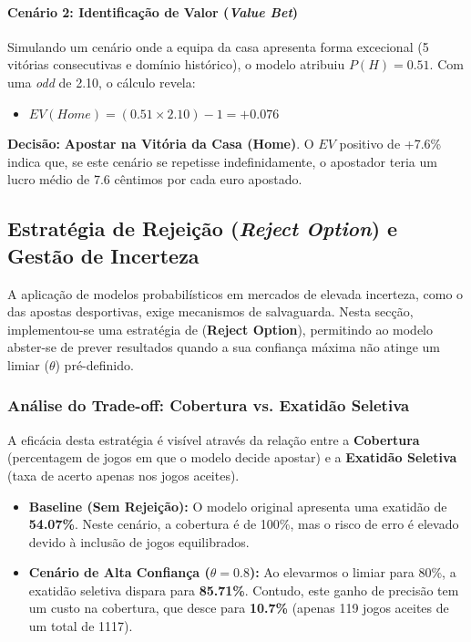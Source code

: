 \documentclass[10pt]{article}
\begin{document}
\paragraph{Cenário 2: Identificação de Valor (\textit{Value Bet})} 
Simulando um cenário onde a equipa da casa apresenta forma excecional (5 vitórias consecutivas e domínio histórico), o modelo atribuiu $P(H) = 0.51$. Com uma \textit{odd} de 2.10, o cálculo revela:
\begin{itemize}
    \item $EV(Home) = (0.51 \times 2.10) - 1 = +0.076$
\end{itemize}
\textbf{Decisão:} \textbf{Apostar na Vitória da Casa (Home)}. O $EV$ positivo de +7.6\% indica que, se este cenário se repetisse indefinidamente, o apostador teria um lucro médio de 7.6 cêntimos por cada euro apostado.

\subsection{Estratégia de Rejeição (\textit{Reject Option}) e Gestão de Incerteza}

A aplicação de modelos probabilísticos em mercados de elevada incerteza, como o das apostas desportivas, exige mecanismos de salvaguarda. Nesta secção, implementou-se uma estratégia de (\textbf{Reject Option}), permitindo ao modelo abster-se de prever resultados quando a sua confiança máxima não atinge um limiar ($\theta$) pré-definido.

\subsubsection{Análise do Trade-off: Cobertura vs. Exatidão Seletiva}

A eficácia desta estratégia é visível através da relação entre a \textbf{Cobertura} (percentagem de jogos em que o modelo decide apostar) e a \textbf{Exatidão Seletiva} (taxa de acerto apenas nos jogos aceites).

\begin{itemize}
    \item \textbf{Baseline (Sem Rejeição):} O modelo original apresenta uma exatidão de \textbf{54.07\%}. Neste cenário, a cobertura é de 100\%, mas o risco de erro é elevado devido à inclusão de jogos equilibrados.
    \item \textbf{Cenário de Alta Confiança ($\theta = 0.8$):} Ao elevarmos o limiar para 80\%, a exatidão seletiva dispara para \textbf{85.71\%}. Contudo, este ganho de precisão tem um custo na cobertura, que desce para \textbf{10.7\%} (apenas 119 jogos aceites de um total de 1117).
\end{itemize}
\end{document}
